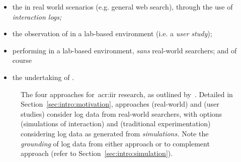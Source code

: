 \begin{itemize}
    \item[]{ the  in real world scenarios (e.g. general web search), through the use of \emph{interaction logs;}}
    \item[]{ the observation of  in a lab-based environment (i.e. a \emph{user study});}
    \item[]{ performing  in a lab-based environment, \emph{sans} real-world searchers; and of course}
    \item[]{ the undertaking of .}
\end{itemize}

\begin{figure}[t!]
    \centering
    \caption[Approaches to~\gls{acr:iir} research]{The four approaches for~\gls{acr:iir} research, as outlined by~\cite{keskustalo2008user_simulation}. Detailed in Section~\ref{sec:intro:motivation}, approaches  (real-world) and  (user studies) consider log data from real-world searchers, with options  (simulations of interaction) and  (traditional experimentation) considering log data as generated from \emph{simulations.} Note the \emph{grounding} of log data from either approach  or  to complement approach  (refer to Section~\ref{sec:intro:simulation}).}
    \label{fig:ch1-options}
\end{figure}

